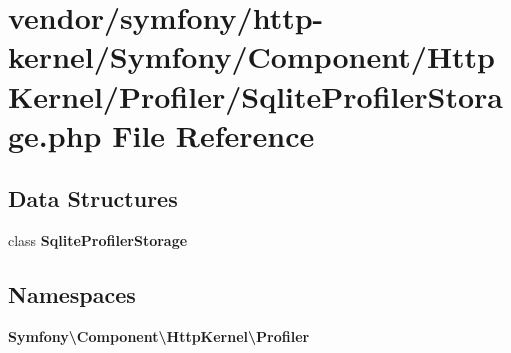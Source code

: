 \section{vendor/symfony/http-\/kernel/\+Symfony/\+Component/\+Http\+Kernel/\+Profiler/\+Sqlite\+Profiler\+Storage.php File Reference}
\label{_sqlite_profiler_storage_8php}
\subsection*{Data Structures}
\begin{DoxyCompactItemize}
\item 
class {\bf Sqlite\+Profiler\+Storage}
\end{DoxyCompactItemize}
\subsection*{Namespaces}
\begin{DoxyCompactItemize}
\item 
 {\bf Symfony\textbackslash{}\+Component\textbackslash{}\+Http\+Kernel\textbackslash{}\+Profiler}
\end{DoxyCompactItemize}
